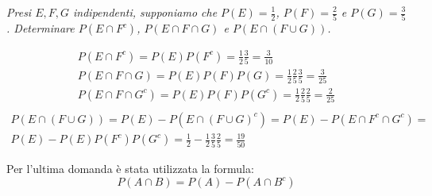 \begin{Example}{}{}
    \textit{Presi $E,F,G$ indipendenti, supponiamo che $P(E)=\frac{1}{2}$, $P(F)=\frac{2}{5}$ e $P(G)=\frac{3}{5}$. Determinare $P(E\cap F^c)$, $P(E\cap F\cap G)$ e $P(E\cap(F\cup G))$.}

    \begin{gather*}
        P(E\cap F^c)=P(E)P(F^c)=\frac{1}{2}\frac{3}{5}=\frac{3}{10}\\
        P(E\cap F\cap G)=P(E)P(F)P(G)=\frac{1}{2}\frac{2}{5}\frac{3}{5}=\frac{3}{25}\\
        P(E\cap F\cap G^c)=P(E)P(F)P(G^c)=\frac{1}{2}\frac{2}{5}\frac{2}{5}=\frac{2}{25}\\
    \end{gather*}
    \begin{align*}
        P(E\cap (F\cup G))=P(E)-P(E\cap (F\cup G)^c)=P(E)-P(E\cap F^c\cap G^c)=\\P(E)-P(E)P(F^c)P(G^c)=\frac{1}{2}-\frac{1}{2}\frac{3}{5}\frac{2}{5}=\frac{19}{50}    
    \end{align*}
    \begin{osservation}
        Per l'ultima domanda è stata utilizzata la formula:
        \begin{equation*}
            P(A\cap B)=P(A)-P(A\cap B^c)
        \end{equation*}    
    \end{osservation}
\end{Example}

